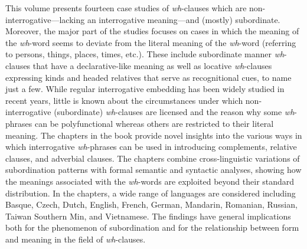 This volume presents fourteen case studies of \textit{wh}-clauses which are non-interrogative—lacking an interrogative meaning—and (mostly) subordinate. Moreover, the major part of the studies focuses on cases in which the meaning of the \textit{wh}-word seems to deviate from the literal meaning of the \textit{wh}-word (referring to persons, things, places, times, etc.). These include subordinate manner \textit{wh}-clauses that have a declarative-like meaning as well as locative \textit{wh}-clauses expressing kinds and headed relatives that serve as recognitional cues, to name just a few. While regular interrogative embedding has been widely studied in recent years, little is known about the circumstances under which non-interrogative (subordinate) \textit{wh}-clauses are licensed and the reason why some \textit{wh}-phrases can be polyfunctional whereas others are restricted to their literal meaning. The chapters in the book provide novel insights into the various ways in which interrogative \textit{wh}-phrases can be used in introducing complements, relative clauses, and adverbial clauses. The chapters combine cross-linguistic variations of subordination patterns with formal semantic and syntactic analyses, showing how the meanings associated with the \textit{wh}-words are exploited beyond their standard distribution. In the chapters, a wide range of languages are considered including Basque, Czech, Dutch, English, French, German, Mandarin, Romanian, Russian, Taiwan Southern Min, and Vietnamese. The findings have general implications both for the phenomenon of subordination and for the relationship between form and meaning in the field of \textit{wh}-clauses.
\endinput